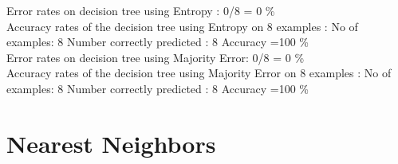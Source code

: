 \documentclass[11pt]{article}
\begin{document}
\begin{enumerate}
\begin{enumerate}
Error rates on decision tree using Entropy : 0/8  = 0 \%\\
Accuracy rates of the decision tree using Entropy on 8 examples :
No of examples: 8  Number  correctly predicted : 8  Accuracy =100 \% \\

Error rates on decision tree using Majority Error: 0/8  = 0 \%\\
Accuracy rates of the decision tree using Majority Error on 8 examples :
No of examples: 8  Number  correctly predicted : 8  Accuracy =100 \%  \\
	
		\end{enumerate}
		
\end{enumerate}	


\section{Nearest Neighbors}
\end{document}
